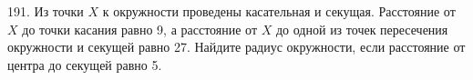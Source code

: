 191. Из точки $X$ к окружности проведены касательная и секущая. Расстояние от $X$ до точки касания равно 9, а расстояние от $X$ до одной из точек пересечения окружности и секущей равно 27. Найдите радиус окружности, если расстояние от центра до секущей равно 5.\\
